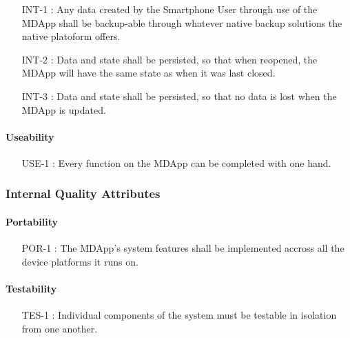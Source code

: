                 \begin{itemize}[leftmargin=1.4cm]
                    \item[INT-1 :] Any data created by the Smartphone User through use of the MDApp shall be backup-able through whatever native backup solutions the native platoform offers.
                    \item[INT-2 :] Data and state shall be persisted, so that when reopened, the MDApp will have the same state as when it was last closed.
                    \item[INT-3 :] Data and state shall be persisted, so that no data is lost when the MDApp is updated.
                \end{itemize}

            \paragraph{Useability}

                \begin{itemize}[leftmargin=1.4cm]
                    \item[USE-1 :] Every function on the MDApp can be completed with one hand.
                \end{itemize}

        \subsubsection{Internal Quality Attributes}

            \paragraph{Portability}

                \begin{itemize}[leftmargin=1.4cm]
                    \item[POR-1 :] The MDApp's system features shall be implemented accross all the device platforms it runs on.
                \end{itemize}

            \paragraph{Testability}

                \begin{itemize}[leftmargin=1.4cm]
                    \item[TES-1 :] Individual components of the system must be testable in isolation from one another.
                \end{itemize}






